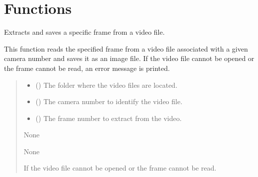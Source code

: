 \documentclass[letterpaper,10pt,english]{sphinxmanual}
\begin{document}
\section{Functions}
\label{\detokenize{CameraUtils:functions}}

\begin{fulllineitems}
\label{\detokenize{CameraUtils:CameraUtils.GetFrame}}
\pysigstartsignatures
{}
\pysigstopsignatures
\sphinxAtStartPar
Extracts and saves a specific frame from a video file.

\sphinxAtStartPar
This function reads the specified frame from a video file associated with a given camera number and saves it as an image file. If the video file cannot be opened or the frame cannot be read, an error message is printed.
\begin{quote}\begin{description}
\begin{itemize}
\item {} 
\sphinxAtStartPar
{} () \textendash{} The folder where the video files are located.

\item {} 
\sphinxAtStartPar
{} () \textendash{} The camera number to identify the video file.

\item {} 
\sphinxAtStartPar
{} () \textendash{} The frame number to extract from the video.

\end{itemize}

\sphinxAtStartPar
None

\sphinxAtStartPar
None

\sphinxAtStartPar
{} \textendash{} If the video file cannot be opened or the frame cannot be read.

\end{description}\end{quote}

\end{fulllineitems}
\end{document}
